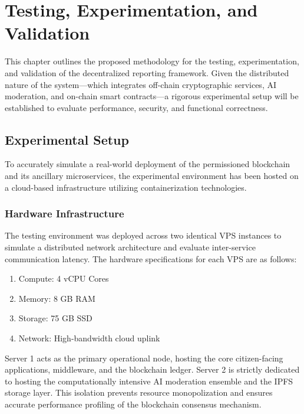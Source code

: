 \chapter{Testing, Experimentation, and Validation}

This chapter outlines the proposed methodology for the testing, experimentation, and validation of the decentralized reporting framework. Given the distributed nature of the system—which integrates off-chain cryptographic services, AI moderation, and on-chain smart contracts—a rigorous experimental setup will be established to evaluate performance, security, and functional correctness.

\section{Experimental Setup}
\label{subsec:experimental-setup}

To accurately simulate a real-world deployment of the permissioned blockchain and its ancillary microservices, the experimental environment has been hosted on a cloud-based infrastructure utilizing containerization technologies.

\subsection{Hardware Infrastructure}
The testing environment was deployed across two identical \ac{VPS} instances to simulate a distributed network architecture and evaluate inter-service communication latency. The hardware specifications for each \ac{VPS} are as follows:
\begin{enumerate}
    \item Compute: 4 vCPU Cores
    \item Memory: 8 GB RAM
    \item Storage: 75 GB SSD
    \item Network: High-bandwidth cloud uplink
\end{enumerate}
Server 1 acts as the primary operational node, hosting the core citizen-facing applications, middleware, and the blockchain ledger. Server 2 is strictly dedicated to hosting the computationally intensive AI moderation ensemble and the IPFS storage layer. This isolation prevents resource monopolization and ensures accurate performance profiling of the blockchain consensus mechanism.

